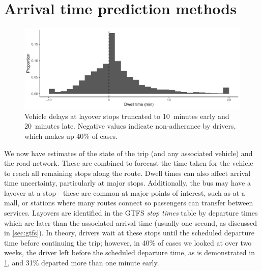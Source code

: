\section{Arrival time prediction methods}
\label{sec:prediction_arrival_time}




\begin{knitrout}\small
{}\color{fgcolor}\begin{figure}

{\centering \includegraphics[width=\linewidth]{figure/layover_observance-1} 

}

\caption[Vehicle delays at layover stops truncated to 10~minutes early and 20~minutes late]{Vehicle delays at layover stops truncated to 10~minutes early and 20~minutes late. Negative values indicate non-adherance by drivers, which makes up 40\% of cases.}\label{fig:layover_observance}
\end{figure}


\end{knitrout}

We now have estimates of the state of the trip (and any associated vehicle) and the road network. These are combined to forecast the time taken for the vehicle to reach all remaining stops along the route. Dwell times can also affect arrival time uncertainty, particularly at major stops. Additionally, the bus may have a layover at a stop---these are common at major points of interest, such as at a mall, or stations where many routes connect so passengers can transfer between services. Layovers are identified in the GTFS \emph{stop times} table by departure times which are later than the associated arrival time (usually one second, as discussed in \cref{sec:gtfs}). In theory, drivers wait at these stops until the scheduled departure time before continuing the trip; however, in 40\% of cases we looked at over two weeks, the driver left before the scheduled departure time, as is demonstrated in \cref{fig:layover_observance}, and 31\% departed more than one minute early.


